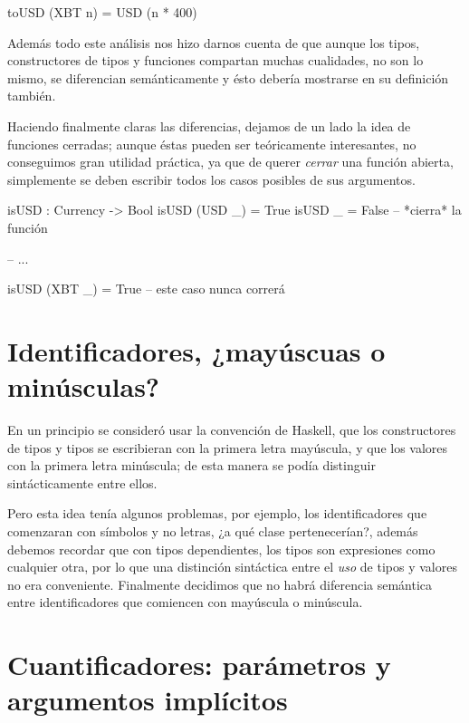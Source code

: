 {\begin{designfr}
\begin{anglercode}
toUSD (XBT n) = USD (n * 400)
\end{anglercode}

Además todo este análisis nos hizo darnos cuenta de que aunque los tipos, constructores de tipos y funciones compartan muchas cualidades, no son lo mismo, se diferencian semánticamente y ésto debería mostrarse en su definición también.

Haciendo finalmente claras las diferencias, dejamos de un lado la idea de funciones cerradas; aunque éstas pueden ser teóricamente interesantes, no conseguimos gran utilidad práctica, ya que de querer \textit{cerrar} una función abierta, simplemente se deben escribir todos los casos posibles de sus argumentos.

\begin{anglercode}
isUSD : Currency -> Bool
isUSD (USD _) = True
isUSD _ = False         -- *cierra* la función

-- ...

isUSD (XBT _) = True    -- este caso nunca correrá
\end{anglercode}
\end{designfr}

\section{Identificadores, ¿mayúscuas o minúsculas?}

\begin{designfr}
En un principio se consideró usar la convención de Haskell, que los constructores de tipos y tipos se escribieran con la primera letra mayúscula, y que los valores con la primera letra minúscula; de esta manera se podía distinguir sintácticamente entre ellos.

Pero esta idea tenía algunos problemas, por ejemplo, los identificadores que comenzaran con símbolos y no letras, ¿a qué clase pertenecerían?, además debemos recordar que con tipos dependientes, los tipos son expresiones como cualquier otra, por lo que una distinción sintáctica entre el \emph{uso} de tipos y valores no era conveniente. Finalmente decidimos que no habrá diferencia semántica entre identificadores que comiencen con mayúscula o minúscula.
\end{designfr}

\section{Cuantificadores: parámetros y argumentos implícitos}

}
